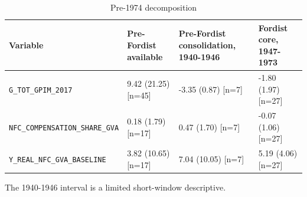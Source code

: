 \begin{landscape}
\begin{table}[p]
\centering
\small
\caption{Pre-1974 decomposition}
\begin{tabular}{p{4.2cm}p{2.7cm}p{2.7cm}p{2.7cm}}
\toprule
Variable & Pre-Fordist available & Pre-Fordist consolidation, 1940-1946 & Fordist core, 1947-1973
\\
\midrule
\nolinkurl{G_TOT_GPIM_2017} & 9.42 (21.25) [n=45] & -3.35 (0.87) [n=7] & -1.80 (1.97) [n=27]
\\
\nolinkurl{NFC_COMPENSATION_SHARE_GVA} & 0.18 (1.79) [n=17] & 0.47 (1.70) [n=7] & -0.07 (1.06) [n=27]
\\
\nolinkurl{Y_REAL_NFC_GVA_BASELINE} & 3.82 (10.65) [n=17] & 7.04 (10.05) [n=7] & 5.19 (4.06) [n=27]
\\
\bottomrule
\end{tabular}
\par\vspace{0.3em}\footnotesize The 1940-1946 interval is a limited short-window descriptive.
\end{table}
\end{landscape}
